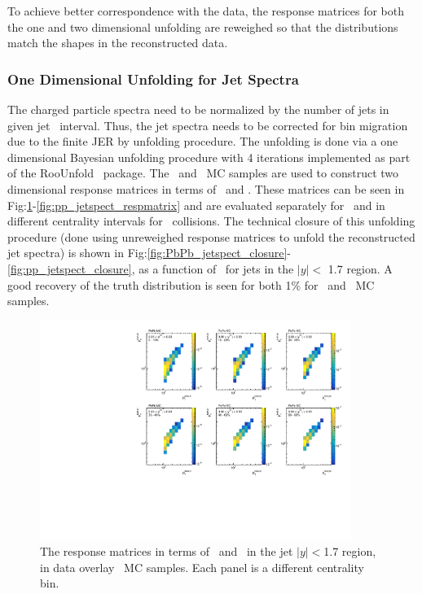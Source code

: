  To achieve better correspondence with the data, the response matrices for both the one and two dimensional unfolding are reweighed so that the distributions match the shapes in the reconstructed data.
 

\subsubsection{One Dimensional Unfolding for Jet Spectra}
\label{sec:1dunfolding}
The charged particle spectra need to be normalized by the number of jets in given jet \pt\ interval. Thus, the jet spectra needs to be corrected for bin migration due to the finite JER by unfolding procedure. 
The unfolding is done via a one dimensional Bayesian unfolding procedure with 4 iterations implemented as part of the RooUnfold~\cite{Adye:2011gm} package. The \pp\ and \PbPb\ MC samples are used to construct two dimensional response matrices in terms of \ptjettruth\ and \ptjetreco. These matrices can be seen in Fig:\ref{fig:PbPb_jetspect_respmatrix}-\ref{fig:pp_jetspect_respmatrix} and are evaluated separately for \pp\ and in different centrality intervals for \PbPb\ collisions. The technical closure of this unfolding procedure (done using unreweighed response matrices to unfold the reconstructed jet spectra) is shown in Fig:\ref{fig:PbPb_jetspect_closure}-\ref{fig:pp_jetspect_closure}, as a function of \ptjet\ for jets in the $|y| < $ 1.7 region. A good recovery of the truth distribution is seen for both 1\% for \pbpb\ and \pp\ MC samples.

\begin{figure}[ht]
\centering
\includegraphics[page=5, width=0.9\textwidth]{figures_corrections/resp_matrix_jet_PbPb_MC.pdf}
\caption{The response matrices in terms of \ptjetreco\ and \ptjettruth\ in the jet $|y| < $1.7 region, in data overlay \pbpb\ MC samples. Each panel is a different centrality bin.}
\label{fig:PbPb_jetspect_respmatrix}
\end{figure}


